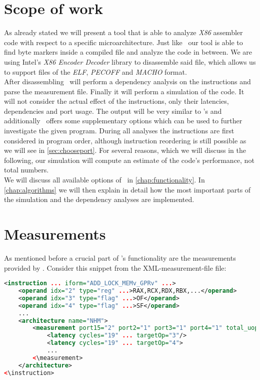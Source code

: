  
\section{Scope of work}

As already stated we will present a tool that is able to analyze \emph{X86} assembler code with respect to a specific microarchitecture. Just like \iaca\ our tool is able to find byte markers inside a compiled file and analyze the code in between.  We are using Intel's \emph{X86 Encoder Decoder} library \cite{xed} to disassemble said file, which allows us to support files of the \emph{ELF}, \emph{PECOFF} and \emph{MACHO} format.\\

After disassembling \suaca\ will perform a dependency analysis on the instructions and parse the measurement file. Finally it will perform a simulation of the code. It will not consider the actual effect of the instructions, only their latencies, dependencies and port usage. The output will be very similar to \iaca's and additionally \suaca\ offers some supplementary options which can be used to further investigate the given program. During all analyses the instructions are first considered in program order, although instruction reordering is still possible as we will see in \autoref{sec:chooseport}. For several reasons, which we will discuss in the following, our simulation will compute an estimate of the code's performance, not total numbers.\\
We will discuss all available options of \suaca\ in \autoref{chap:functionality}. In \autoref{chap:algorithms} we will then explain in detail how the most important parts of the simulation and the dependency analyses are implemented.



\section{Measurements}
\label{sec:measurements}

As mentioned before a crucial part of \suaca's functionality are the measurements provided by \cite{Andreas}. Consider this snippet from the XML-measurement-file file:

\begin{lstlisting}[language=XML, basicstyle=\ttfamily\scriptsize, breaklines=false]
<instruction ... iform="ADD_LOCK_MEMv_GPRv" ...>
    <operand idx="2" type="reg" ...>RAX,RCX,RDX,RBX,...</operand>
    <operand idx="3" type="flag" ...>OF</operand>
    <operand idx="4" type="flag" ...>SF</operand>
    ...
    <architecture name="NHM">
        <measurement port15="2" port2="1" port3="1" port4="1" total_uops="5">
            <latency cycles="19" ... targetOp="3"/>
            <latency cycles="19" ... targetOp="4">
            ...
        <\measurement>
    </architecture>
<\instruction>
\end{lstlisting}

